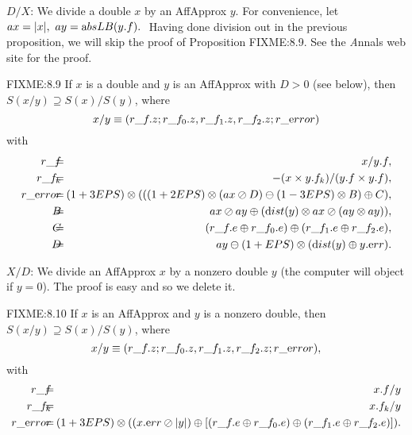 $D/X$:
We   divide a double $x$ by an AffApprox $y$.
For convenience, let $ax = |x|,\ ay = {\textrm absLB}(y.f).\ $  Having done division out in the previous proposition, we will skip the proof of Proposition FIXME:8.9.  See the {\textit Annals}
web site for the proof.

\begin{proposition}{FIXME:8.9} If $x$ is a double and $y$ is an 
{\textrm AffApprox}  with $D > 0$ {\textrm (}\/see below{\textrm ),}
 then $S(x / y) \supseteq S(x) / S(y)${\textrm ,} where
$$x / y \equiv (r\_f.z; r\_f_0.z, r\_f_1.z, r\_f_2.z; r\_{\textrm error})$$
with
 \begin{eqnarray*}
r\_f&\hskip-8pt =\hskip-8pt& x / y.f,\\
r\_f_k&\hskip-8pt =\hskip-8pt& -(x \times y.f_k)/ (y.f \times y.f),\\
r\_{\textrm error}&\hskip-8pt =\hskip-8pt& (1+3EPS) \otimes ( 
((1 + 2EPS) \otimes (ax  \oslash D) \ominus (1 - 3EPS) \otimes B)
\oplus C),\\
 B&\hskip-8pt =\hskip-8pt& ax \oslash ay  \oplus ({\textrm dist}(y) \otimes ax \oslash (ay \otimes ay)),\\
C& \hskip-8pt=\hskip-8pt& (r\_f.e \oplus r\_f_0.e)
\oplus (r\_f_1.e \oplus r\_f_2.e),\\
D &\hskip-8pt=\hskip-8pt& ay \ominus (1 + EPS) \otimes ({\textrm dist}(y) \oplus y.{\textrm err}).
\end{eqnarray*}
\end{proposition}

$X/D$:
We   divide an AffApprox $x$ by a nonzero double $y$ (the computer will object if $y = 0$).  The proof is easy  and
so we delete it.

\begin{proposition}{FIXME:8.10} 
If $x$ is an {\textrm AffApprox}  and $y$ is a nonzero double{\textrm ,} then
$S(x / y) \supseteq S(x) / S(y)${\textrm ,} where
$$x / y \equiv (r\_f.z; r\_f_0.z, r\_f_1.z, r\_f_2.z; r\_{\textrm error}),$$
with
\begin{eqnarray*}
r\_f &\hskip-8pt=\hskip-8pt& x.f / y\\
r\_f_k &\hskip-8pt=\hskip-8pt& x.f_k / y\\
r\_{\textrm error} &\hskip-8pt = \hskip-8pt&
(1+3EPS) \otimes ( 
(x.{\textrm err}\oslash |y|)
\oplus 
[(r\_f.e \oplus r\_f_0.e) \oplus (r\_f_1.e \oplus r\_f_2.e)]
                                               ).\end{eqnarray*}
\end{proposition}

